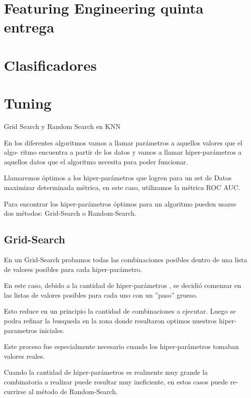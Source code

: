 \documentclass[a4paper ,12pt]{article}
\begin{document}
\section{Featuring Engineering quinta entrega}

\newpage
\section{Clasificadores}

\newpage
\section{Tuning}

Grid Search y Random Search en KNN

En los diferentes algoritmos vamos a llamar parámetros a aquellos valores que el algo-
ritmo encuentra a partir de los datos y vamos a llamar hiper-parámetros a
aquellos datos que el algoritmo necesita para poder funcionar.

Llamaremos óptimos a los hiper-parámetros que logren para un set de Datos maximizar determinada métrica, en este caso, utilizamos la métrica ROC AUC.\

Para encontrar los hiper-parámetros óptimos para un algoritmo pueden usarse dos métodos: Grid-Search o Random-Search.\\

\subsection{Grid-Search}

En un Grid-Search probamos todas las combinaciones posibles dentro de una lista de valores posibles para cada hiper-parámetro.

En este caso, debido a la cantidad de hiper-parámetros , se decidió comenzar en las listas de valores posibles para cada uno con un ”paso” grueso.

Esto reduce en un principio la cantidad de combinaciones a ejecutar. Luego se podra refinar la busqueda en la zona donde resultaron optimos nuestros hiper-parametros iniciales.

Este proceso fue especialmente necesario cuando los hiper-parámetros tomaban valores reales.

Cuando la cantidad de hiper-parámetros es realmente muy grande la combinatoria a realizar puede resultar muy ineficiente, en estos casos puede re-
currirse al método de Random-Search.
\end{document}
